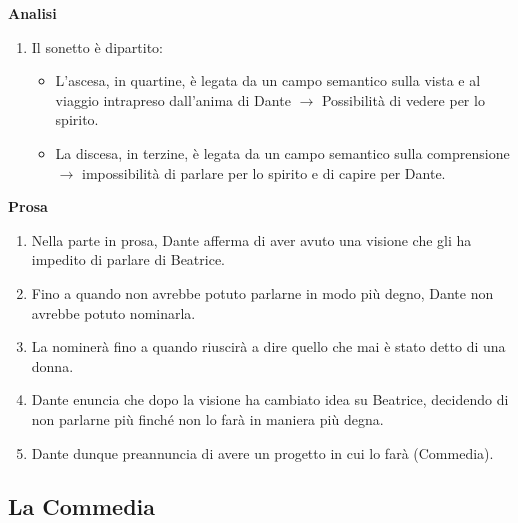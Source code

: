 \documentclass{article}
\begin{document}
\textbf{Analisi}
\begin{enumerate}
    \item Il sonetto è dipartito:
        \begin{itemize}
            \item L'ascesa, in quartine, è legata da un campo semantico sulla vista e al viaggio intrapreso dall'anima di Dante $\rightarrow$ Possibilità di vedere per lo spirito.
            \item La discesa, in terzine, è legata da un campo semantico sulla comprensione $\rightarrow$ impossibilità di parlare per lo spirito e di capire per Dante.
        \end{itemize}
\end{enumerate}

\textbf{Prosa}
\begin{enumerate}
    \item Nella parte in prosa, Dante afferma di aver avuto una visione che gli ha impedito di parlare di Beatrice.
    \item Fino a quando non avrebbe potuto parlarne in modo più degno, Dante non avrebbe potuto nominarla.
    \item La nominerà fino a quando riuscirà a dire quello che mai è stato detto di una donna.
    \item Dante enuncia che dopo la visione ha cambiato idea su Beatrice, decidendo di non parlarne più finché non lo farà in maniera più degna.
    \item Dante dunque preannuncia di avere un progetto in cui lo farà (Commedia).
\end{enumerate}

\newpage
\subsection{La Commedia}
\end{document}
